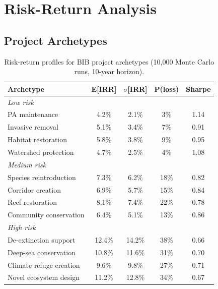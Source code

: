\section{Risk-Return Analysis}

\label{sec:analysis}

\subsection{Project Archetypes}

\begin{table}[H]
\centering
\caption{Risk-return profiles for BIB project archetypes (10{,}000 Monte
Carlo runs, 10-year horizon).}
\label{tab:riskreturn}
\begin{tabular}{lcccc}
\toprule
\textbf{Archetype} & \textbf{E[IRR]} & \textbf{$\sigma$[IRR]} &
  \textbf{P(loss)} & \textbf{Sharpe} \\
\midrule
\multicolumn{5}{l}{\emph{Low risk}} \\
\quad PA maintenance & 4.2\% & 2.1\% & 3\% & 1.14 \\
\quad Invasive removal & 5.1\% & 3.4\% & 7\% & 0.91 \\
\quad Habitat restoration & 5.8\% & 3.8\% & 9\% & 0.95 \\
\quad Watershed protection & 4.7\% & 2.5\% & 4\% & 1.08 \\
\midrule
\multicolumn{5}{l}{\emph{Medium risk}} \\
\quad Species reintroduction & 7.3\% & 6.2\% & 18\% & 0.82 \\
\quad Corridor creation & 6.9\% & 5.7\% & 15\% & 0.84 \\
\quad Reef restoration & 8.1\% & 7.4\% & 22\% & 0.78 \\
\quad Community conservation & 6.4\% & 5.1\% & 13\% & 0.86 \\
\midrule
\multicolumn{5}{l}{\emph{High risk}} \\
\quad De-extinction support & 12.4\% & 14.2\% & 38\% & 0.66 \\
\quad Deep-sea conservation & 10.8\% & 11.6\% & 31\% & 0.70 \\
\quad Climate refuge creation & 9.6\% & 9.8\% & 27\% & 0.71 \\
\quad Novel ecosystem design & 11.2\% & 12.8\% & 34\% & 0.67 \\
\bottomrule
\end{tabular}
\end{table}


